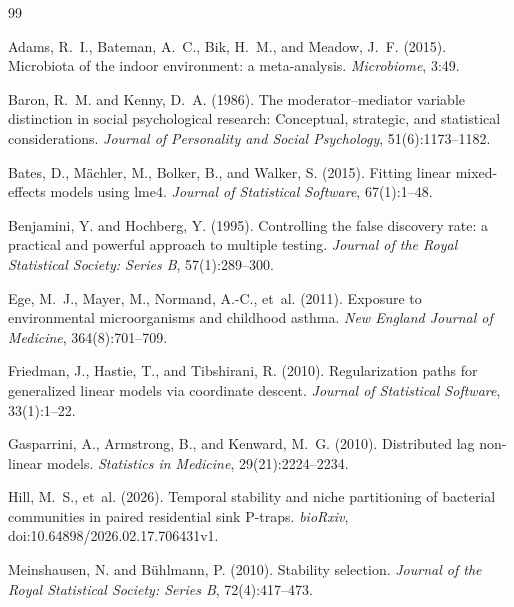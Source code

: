 \documentclass[11pt,letterpaper]{article}
\begin{document}


\begin{thebibliography}{99}

Adams, R.~I., Bateman, A.~C., Bik, H.~M., and Meadow, J.~F. (2015).
\newblock Microbiota of the indoor environment: a meta-analysis.
\newblock \emph{Microbiome}, 3:49.

Baron, R.~M. and Kenny, D.~A. (1986).
\newblock The moderator--mediator variable distinction in social psychological research: Conceptual, strategic, and statistical considerations.
\newblock \emph{Journal of Personality and Social Psychology}, 51(6):1173--1182.

Bates, D., M\"achler, M., Bolker, B., and Walker, S. (2015).
\newblock Fitting linear mixed-effects models using lme4.
\newblock \emph{Journal of Statistical Software}, 67(1):1--48.

Benjamini, Y. and Hochberg, Y. (1995).
\newblock Controlling the false discovery rate: a practical and powerful approach to multiple testing.
\newblock \emph{Journal of the Royal Statistical Society: Series B}, 57(1):289--300.

Ege, M.~J., Mayer, M., Normand, A.-C., et~al. (2011).
\newblock Exposure to environmental microorganisms and childhood asthma.
\newblock \emph{New England Journal of Medicine}, 364(8):701--709.

Friedman, J., Hastie, T., and Tibshirani, R. (2010).
\newblock Regularization paths for generalized linear models via coordinate descent.
\newblock \emph{Journal of Statistical Software}, 33(1):1--22.

Gasparrini, A., Armstrong, B., and Kenward, M.~G. (2010).
\newblock Distributed lag non-linear models.
\newblock \emph{Statistics in Medicine}, 29(21):2224--2234.

Hill, M.~S., et~al. (2026).
\newblock Temporal stability and niche partitioning of bacterial communities in paired residential sink P-traps.
\newblock \emph{bioRxiv}, doi:10.64898/2026.02.17.706431v1.

Meinshausen, N. and B\"uhlmann, P. (2010).
\newblock Stability selection.
\newblock \emph{Journal of the Royal Statistical Society: Series B}, 72(4):417--473.


\end{thebibliography}
\end{document}
